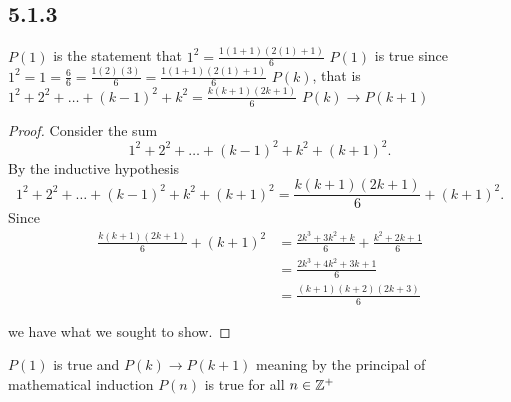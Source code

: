 \documentclass[12pt,titlepage]{extarticle}
\begin{document}
\subsection*{5.1.3}
\begin{tasks}
    \task $P(1)$ is the statement that $1^2 = \frac{1(1 + 1)(2(1) + 1)}{6}$
    \task $P(1)$ is true since $1^2 = 1 = \frac{6}{6} = \frac{1(2)(3)}{6} = \frac{1(1+1)(2(1)+1)}{6}$
    \task $P(k)$, that is $1^2 + 2^2 + \ldots + (k-1)^2 + k^2 = \frac{k(k+1)(2k+1)}{6}$
    \task $P(k) \to P(k+1)$
    \task \begin{proof}
        Consider the sum
        \[
            1^2 + 2^2 + \ldots + (k-1)^2 + k^2 + (k+1)^2
        .\]
        By the inductive hypothesis
        \[
            1^2 + 2^2 + \ldots + (k-1)^2 + k^2 + (k+1)^2 = \frac{k(k+1)(2k+1)}{6} + (k+1)^2
        .\]
        Since
        \begin{align*}
            \frac{k(k+1)(2k+1)}{6} + (k+1)^2 &= \frac{2k^3 + 3k^2 + k}{6} + \frac{k^2 + 2k + 1}{6} \\
            &= \frac{2k^3 + 4k^2 + 3k + 1}{6} \\
            &= \frac{(k+1)(k+2)(2k+3)}{6}
        \end{align*}

        we have what we sought to show.
    \end{proof}
    \task $P(1)$ is true and $P(k) \to P(k+1)$ meaning by the principal of mathematical induction $P(n)$ is true for all $n \in \mathbb{Z}^+$
\end{tasks}
\end{document}
